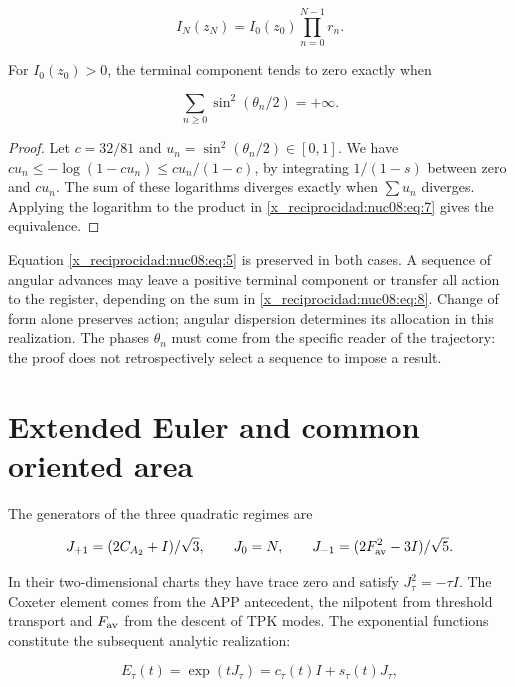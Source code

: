 \begin{equation}
I_N(z_N)=I_0(z_0)\prod_{n=0}^{N-1}r_n.
\label{x_reciprocidad:nuc08:eq:7}
\end{equation}

\begin{theorem}
For \(I_0(z_0)>0\), the terminal component tends to zero exactly when

\begin{equation}
\sum_{n\ge0}\sin^2(\theta_n/2)=+\infty.
\label{x_reciprocidad:nuc08:eq:8}
\end{equation}
\end{theorem}

\begin{proof}
Let \(c=32/81\) and \(u_n=\sin^2(\theta_n/2)\in[0,1]\). We have \(cu_n\leq-\log(1-cu_n)\leq cu_n/(1-c)\), by integrating \(1/(1-s)\) between zero and \(cu_n\). The sum of these logarithms diverges exactly when \(\sum u_n\) diverges. Applying the logarithm to the product in \eqref{x_reciprocidad:nuc08:eq:7} gives the equivalence.
\end{proof}

Equation \eqref{x_reciprocidad:nuc08:eq:5} is preserved in both cases. A sequence of angular advances may leave a positive terminal component or transfer all action to the register, depending on the sum in \eqref{x_reciprocidad:nuc08:eq:8}. Change of form alone preserves action; angular dispersion determines its allocation in this realization. The phases \(\theta_n\) must come from the specific reader of the trajectory: the proof does not retrospectively select a sequence to impose a result.

\section{Extended Euler and common oriented area}

The generators of the three quadratic regimes are

\[
J_{+1}=(2C_{A_2}+I)/\sqrt3,\qquad
J_0=N,\qquad
J_{-1}=(2F_{\rm av}^2-3I)/\sqrt5.
\]

In their two-dimensional charts they have trace zero and satisfy
\(J_\tau^2=-\tau I\). The Coxeter element comes from the APP antecedent, the nilpotent from threshold transport and \(F_{\rm av}\) from the descent of TPK modes. The exponential functions constitute the subsequent analytic realization:

\[
E_\tau(t)=\exp(tJ_\tau)=c_\tau(t)I+s_\tau(t)J_\tau,
\]


